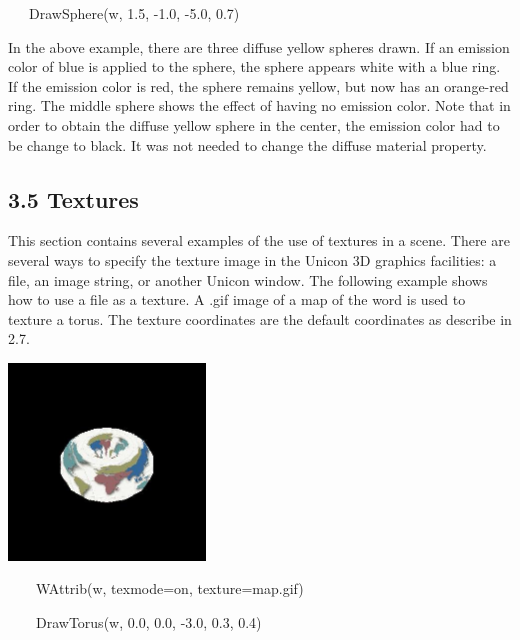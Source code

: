 \documentclass[letterpaper]{article}
\begin{document}
{{\sffamily
\ \ \ DrawSphere(w, 1.5, -1.0, -5.0, 0.7) }


\bigskip

{
In the above example, there are three diffuse yellow spheres drawn. If an emission color of blue is applied to the
sphere, the sphere appears white with a blue ring. If the emission color is red, the sphere remains yellow, but now has
an orange-red ring. The middle sphere shows the effect of having no emission color. Note that in order to obtain the
diffuse yellow sphere in the center, the emission color had to be change to black. It was not needed to change the
diffuse material property.}


\subsection[3.5 Textures]{3.5 Textures}

{
This section contains several examples of the use of textures in a scene. There are several ways to specify the texture
image in the Unicon 3D graphics facilities: a file, an image string, or another Unicon window. The following example
shows how to use a file as a texture. A .gif image of a map of the word is used to texture a torus. The texture
coordinates are the default coordinates as describe in 2.7. }


\bigskip

{\centering  \includegraphics[width=2.0583in,height=2.0583in]{utr9/utr9-img026.jpg} \par}

\bigskip

{\ttfamily
\textsf{\ \ \ \ }\textsf{WAttrib(w, {\textquotedbl}texmode=on{\textquotedbl},
{\textquotedbl}texture=map.gif{\textquotedbl})}}

{\sffamily
\ \ \ \ DrawTorus(w, 0.0, 0.0, -3.0, 0.3, 0.4) }


\bigskip

}
\end{document}
